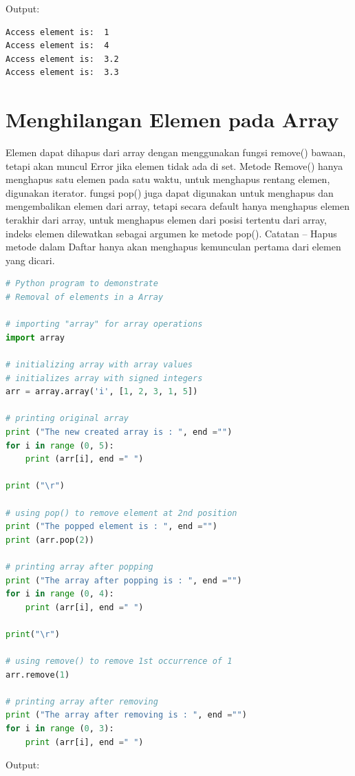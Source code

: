 Output:

\begin{lstlisting}
Access element is:  1
Access element is:  4
Access element is:  3.2
Access element is:  3.3
\end{lstlisting}

\section{Menghilangan Elemen pada Array}

Elemen dapat dihapus dari array dengan menggunakan fungsi remove() bawaan, tetapi akan muncul Error jika elemen tidak ada di set. Metode Remove() hanya menghapus satu elemen pada satu waktu, untuk menghapus rentang elemen, digunakan iterator. fungsi pop() juga dapat digunakan untuk menghapus dan mengembalikan elemen dari array, tetapi secara default hanya menghapus elemen terakhir dari array, untuk menghapus elemen dari posisi tertentu dari array, indeks elemen dilewatkan sebagai argumen ke metode pop().
Catatan – Hapus metode dalam Daftar hanya akan menghapus kemunculan pertama dari elemen yang dicari.

\begin{lstlisting}[language=python, caption=Menghilangkan Elemen Array]
# Python program to demonstrate
# Removal of elements in a Array

# importing "array" for array operations
import array

# initializing array with array values
# initializes array with signed integers
arr = array.array('i', [1, 2, 3, 1, 5])

# printing original array
print ("The new created array is : ", end ="")
for i in range (0, 5):
	print (arr[i], end =" ")

print ("\r")

# using pop() to remove element at 2nd position
print ("The popped element is : ", end ="")
print (arr.pop(2))

# printing array after popping
print ("The array after popping is : ", end ="")
for i in range (0, 4):
	print (arr[i], end =" ")

print("\r")

# using remove() to remove 1st occurrence of 1
arr.remove(1)

# printing array after removing
print ("The array after removing is : ", end ="")
for i in range (0, 3):
	print (arr[i], end =" ")
\end{lstlisting}

Output:

